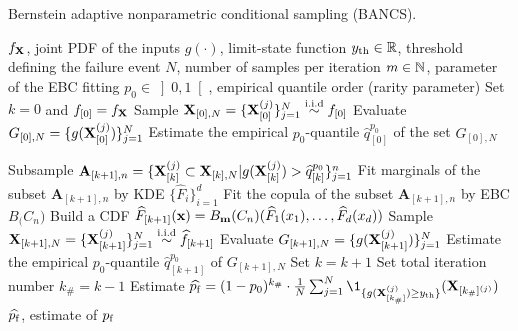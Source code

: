 \begin{algorithm}[h]
\caption{Bernstein adaptive nonparametric conditional sampling (BANCS).}\label{alg:bancs}
\footnotesize
\begin{algorithmic}
\State $f_{\bf X}$, joint PDF of the inputs
\State $g(\cdot)$, limit-state function
\State $y_\mathrm{th} \in \mathbb{R}$, threshold defining the failure event 
\State $N$, number of samples per iteration
\State $m \in \mathbb{N}$, parameter of the EBC fitting
\State $p_0 \in \left]0, 1\right[$, empirical quantile order (rarity parameter)
\State Set $k = 0$ and $f_{[0]} = f_{\bf X}$
\State Sample ${\bf X}_{[0], N} = \{{\bf X}_{[0]}^{(j)}\}_{j=1}^N \overset{\text{i.i.d}}{\sim} f_{[0]}$
\State Evaluate $G_{[0], N} = \{g({\bf X}_{[0]}^{(j)})\}_{j=1}^N$
\State Estimate the empirical $p_0$-quantile $\widehat{q}_{[0]}^{p_0}$ of the set $G_{[0], N}$

\State Subsample $\mathbf{A}_{[k+1], n}=\{{\bf X}_{[k]}^{(j)} \subset {\bf X}_{[k], N}| g({\bf X}_{[k]}^{(j)}) > \widehat{q}_{[k]}^{p_0} \}_{j=1}^n$
\State Fit marginals of the subset $\mathbf{A}_{[k+1], n}$ by KDE $\{\widehat{F}_i\}_{i=1}^d$
\State Fit the copula of the subset $\mathbf{A}_{[k+1], n}$ by EBC $B_\bm(C_n)$
\State Build a CDF $\widehat{F}_{[k+1]}({\bf x}) = B_{\bf m}(C_n)(\widehat{F}_1(x_1), \dots, \widehat{F}_d(x_d))$
\State Sample ${\bf X}_{[k+1], N} = \{{\bf X}_{[k+1]}^{(j)}\}_{j=1}^N \overset{\text{i.i.d}}{\sim} \widehat{f}_{[k+1]}$
\State Evaluate $G_{[k+1], N} = \{g({\bf X}_{[k+1]}^{(j)})\}_{j=1}^N$
\State Estimate the empirical $p_0$-quantile $\widehat{q}_{[k+1]}^{p_0}$ of $G_{[k+1], N}$
\State Set $k = k+1$
\EndWhile
\State Set total iteration number $k_\# = k-1$ 
\State Estimate $\widehat{\pf} = (1 - p_0)^{k_\#} \cdot \frac{1}{N} \sum_{j=1}^N \1_{\{g(\bX_{[k_\#]}^{(j)}) \geq \yth  \}}(\bX_{[k_\#]^{(j)}}) $
\State $\widehat{p_\mathrm{f}}$, estimate of $p_\mathrm{f}$
\end{algorithmic}
\end{algorithm}

